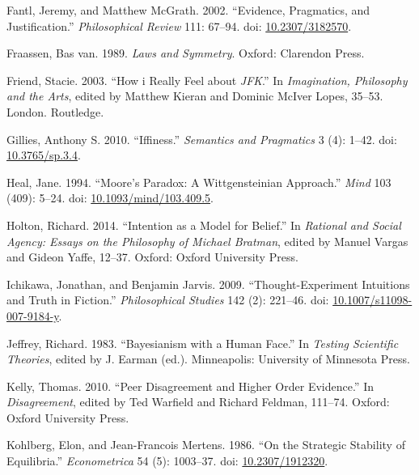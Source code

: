 \documentclass[
  10pt,
  letterpaper,
  DIV=11,
  numbers=noendperiod,
  twoside]{scrartcl}
\newlength{\cslhangindent}
\newenvironment{CSLReferences}[2] %
 {\begin{list}{}{%
  \setlength{\itemindent}{0pt}
  \setlength{\leftmargin}{0pt}
  \setlength{\parsep}{0pt}
  \ifodd #1
   \setlength{\leftmargin}{\cslhangindent}
   \setlength{\itemindent}{-1\cslhangindent}
  \fi
  \setlength{\itemsep}{#2\baselineskip}}}
 {\end{list}}
\begin{document}
\begin{CSLReferences}{1}{0}
Fantl, Jeremy, and Matthew McGrath. 2002. {``Evidence, Pragmatics, and
Justification.''} \emph{Philosophical Review} 111: 67--94. doi:
\href{https://doi.org/10.2307/3182570}{10.2307/3182570}.

Fraassen, Bas van. 1989. \emph{Laws and Symmetry}. Oxford: Clarendon
Press.

Friend, Stacie. 2003. {``How i Really Feel about \emph{JFK}.''} In
\emph{Imagination, Philosophy and the Arts}, edited by Matthew Kieran
and Dominic McIver Lopes, 35--53. London. Routledge.

Gillies, Anthony S. 2010. {``Iffiness.''} \emph{Semantics and
Pragmatics} 3 (4): 1--42. doi:
\href{https://doi.org/10.3765/sp.3.4}{10.3765/sp.3.4}.

Heal, Jane. 1994. {``Moore's Paradox: A Wittgensteinian Approach.''}
\emph{Mind} 103 (409): 5--24. doi:
\href{https://doi.org/10.1093/mind/103.409.5}{10.1093/mind/103.409.5}.

Holton, Richard. 2014. {``Intention as a Model for Belief.''} In
\emph{Rational and Social Agency: Essays on the Philosophy of Michael
Bratman}, edited by Manuel Vargas and Gideon Yaffe, 12--37. Oxford:
Oxford University Press.

Ichikawa, Jonathan, and Benjamin Jarvis. 2009. {``Thought-Experiment
Intuitions and Truth in Fiction.''} \emph{Philosophical Studies} 142
(2): 221--46. doi:
\href{https://doi.org/10.1007/s11098-007-9184-y}{10.1007/s11098-007-9184-y}.

Jeffrey, Richard. 1983. {``Bayesianism with a Human Face.''} In
\emph{Testing Scientific Theories}, edited by J. Earman (ed.).
Minneapolis: University of Minnesota Press.

Kelly, Thomas. 2010. {``Peer Disagreement and Higher Order Evidence.''}
In \emph{Disagreement}, edited by Ted Warfield and Richard Feldman,
111--74. Oxford: Oxford University Press.

Kohlberg, Elon, and Jean-Francois Mertens. 1986. {``On the Strategic
Stability of Equilibria.''} \emph{Econometrica} 54 (5): 1003--37. doi:
\href{https://doi.org/10.2307/1912320}{10.2307/1912320}.


\end{CSLReferences}
\end{document}
